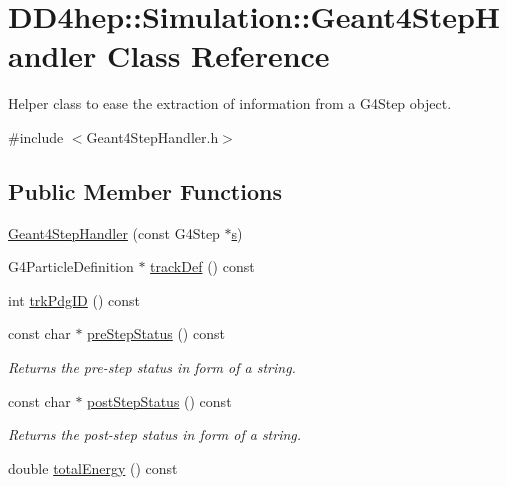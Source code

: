 \hypertarget{class_d_d4hep_1_1_simulation_1_1_geant4_step_handler}{
\section{DD4hep::Simulation::Geant4StepHandler Class Reference}
\label{class_d_d4hep_1_1_simulation_1_1_geant4_step_handler}
}


Helper class to ease the extraction of information from a G4Step object.  


{\ttfamily \#include $<$Geant4StepHandler.h$>$}\subsection*{Public Member Functions}
\begin{DoxyCompactItemize}
\item 
\hyperlink{class_d_d4hep_1_1_simulation_1_1_geant4_step_handler_aa523240f8dd670751a61d26b02c4e0a7}{Geant4StepHandler} (const G4Step $\ast$\hyperlink{_volumes_8cpp_a17ca6bfc8040d695d3cada22a4763d40}{s})
\item 
G4ParticleDefinition $\ast$ \hyperlink{class_d_d4hep_1_1_simulation_1_1_geant4_step_handler_a68f835da79e638dc11306c417bc9495b}{trackDef} () const 
\item 
int \hyperlink{class_d_d4hep_1_1_simulation_1_1_geant4_step_handler_ac3bbde8d1c91b9375c00cfc3b65fac23}{trkPdgID} () const 
\item 
const char $\ast$ \hyperlink{class_d_d4hep_1_1_simulation_1_1_geant4_step_handler_a9e603d8e2f5db29921955409b8fd55be}{preStepStatus} () const 
\begin{DoxyCompactList}\small\item\em Returns the pre-\/step status in form of a string. \item\end{DoxyCompactList}\item 
const char $\ast$ \hyperlink{class_d_d4hep_1_1_simulation_1_1_geant4_step_handler_a607960c9505518f75ad1c9feb3afa935}{postStepStatus} () const 
\begin{DoxyCompactList}\small\item\em Returns the post-\/step status in form of a string. \item\end{DoxyCompactList}\item 
double \hyperlink{class_d_d4hep_1_1_simulation_1_1_geant4_step_handler_addaa9eb154cfccd6500e81a47fb637b0}{totalEnergy} () const 

\end{DoxyCompactItemize}
